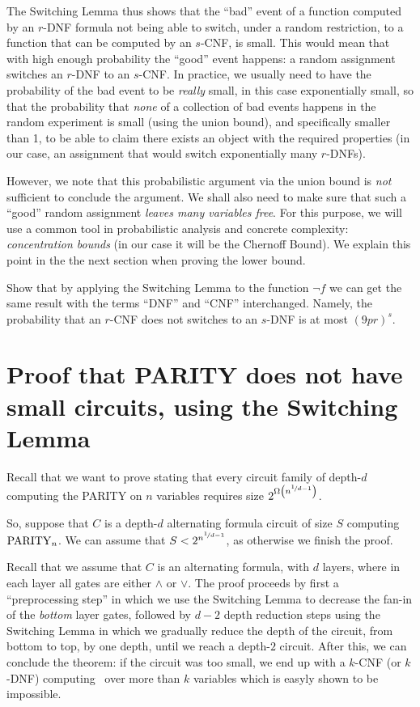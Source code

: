 The Switching Lemma thus shows that the ``bad'' event of a function computed by an $r$-DNF formula not being able to switch, under  a random restriction,  to a function that can be computed by an $s$-CNF, is small. This would mean that with high enough probability the ``good'' event happens: a random assignment switches an $r$-DNF to an $s$-CNF.
In practice, we usually need to have the probability of the bad event to be \emph{really} small, in this case  exponentially small, so that the probability that \emph{none} of a collection of bad events happens in the random experiment is small (using the union bound), and specifically smaller than 1, to be able to claim there exists an object with the required properties (in our case, an assignment that would switch exponentially many $r$-DNFs).  

However, we note that this probabilistic argument via the union bound  is  \emph{not} sufficient to conclude the argument. We shall also need to make sure that such a ``good'' random assignment  \emph{leaves many variables free}. For this purpose, we will use a common tool in probabilistic analysis and concrete complexity: \emph{concentration bounds} (in our case it will be the Chernoff Bound). We  explain this point in the the next section when proving the lower bound.


\begin{exercise} Show that by applying the Switching Lemma to the function $\neg f$ we can get the same result with the terms ``DNF'' and ``CNF'' interchanged. Namely, the probability that an $r$-CNF does not switches to an $s$-DNF is at most $(9pr)^s$.
\end{exercise}

\section{Proof that PARITY does not have small circuits, using the Switching Lemma}

Recall that we want to prove   stating that every circuit family of depth-$d$ computing the PARITY on $n$ variables requires size $2^{\Omega\left(n^{\nicefrac{1}{d-1}}\right)}$.

So, suppose  that $C$ is a depth-$d$ alternating formula circuit of size $S$ computing $\operatorname{PARITY}_n$. We can assume that 
$S< 2^{ n^{\nicefrac{1}{d-1}}}$, as otherwise we finish the proof.


Recall that we assume that $C$ is an alternating formula, with $d$ layers, where in each layer all gates are either $\land$ or $\lor$.  The proof proceeds by first a ``preprocessing step'' in which we use the Switching Lemma to decrease the fan-in of the \emph{bottom} layer gates, followed by   $d-2$ depth reduction steps using the Switching Lemma in which we gradually reduce the depth of the circuit, from bottom to top, by one depth, until we reach a depth-$2$ circuit.
After this, we can conclude the theorem: if the circuit was too small, we end up with a $k$-CNF (or $k$-DNF) computing \Parity\ over more than $k$ variables which is easyly shown to be impossible.




